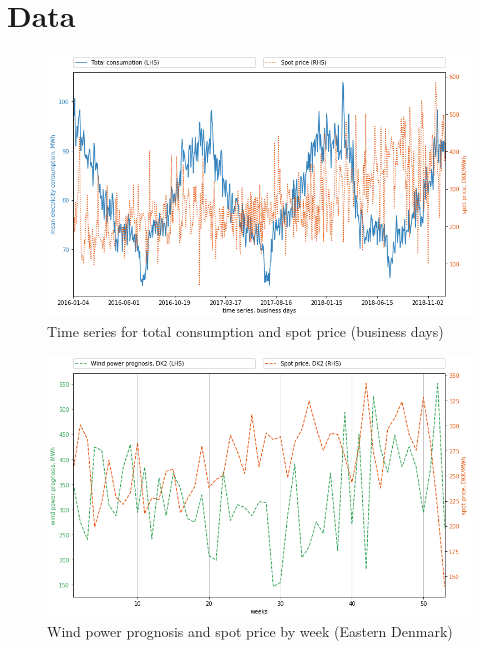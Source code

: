 \section{Data}
\label{app:data}

\begin{figure}[H]
  \centering
  \caption{Time series for total consumption and spot price (business days)}
  \label{fig:cons_price_time_series}
    \includegraphics[width=1 \textwidth]{03_figures/total_time series, business days}
\end{figure}

\begin{figure}[H]
  \centering
  \caption{Wind power prognosis and spot price by week (Eastern Denmark)}
  \label{fig:wp_price_DK2_week}
    \includegraphics[width=1 \textwidth]{03_figures/wp_DK2_weeks}
\end{figure}
